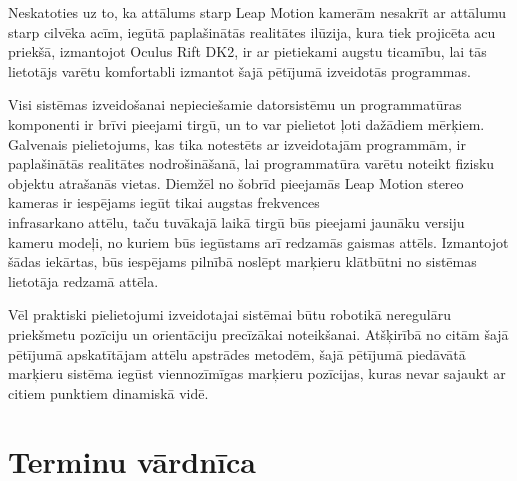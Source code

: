 \documentclass[12pt, a4paper, oneside, openright]{article}
\begin{document}
Neskatoties uz to, ka attālums starp Leap Motion kamerām nesakrīt ar attālumu starp cilvēka
acīm, iegūtā paplašinātās realitātes ilūzija, kura tiek projicēta acu priekšā, izmantojot
Oculus Rift DK2, ir ar pietiekami augstu ticamību, lai tās lietotājs varētu komfortabli izmantot
šajā pētījumā izveidotās programmas.
\par
Visi sistēmas izveidošanai nepieciešamie datorsistēmu un programmatūras komponenti ir brīvi
pieejami tirgū, un to var pielietot ļoti dažādiem mērķiem. Galvenais pielietojums, kas tika
notestēts ar izveidotajām programmām, ir paplašinātās realitātes nodrošināšanā, lai programmatūra
varētu noteikt fizisku objektu atrašanās vietas. Diemžēl no šobrīd pieejamās Leap Motion
stereo kameras ir iespējams iegūt tikai augstas frekvences \\ infrasarkano attēlu, taču
tuvākajā laikā tirgū būs pieejami jaunāku versiju kameru modeļi, no kuriem būs iegūstams
arī redzamās gaismas attēls. Izmantojot šādas iekārtas, būs iespējams pilnībā noslēpt
marķieru klātbūtni no sistēmas lietotāja redzamā attēla. 
\par
Vēl praktiski pielietojumi izveidotajai sistēmai būtu robotikā neregulāru priekšmetu pozīciju un
orientāciju precīzākai noteikšanai. Atšķirībā no citām šajā pētījumā apskatītājam attēlu apstrādes metodēm, šajā 
pētījumā piedāvātā marķieru sistēma iegūst viennozīmīgas marķieru pozīcijas, kuras
nevar sajaukt ar citiem punktiem dinamiskā vidē.



\newpage
\section{Terminu vārdnīca}\label{section_futher}
\end{document}
